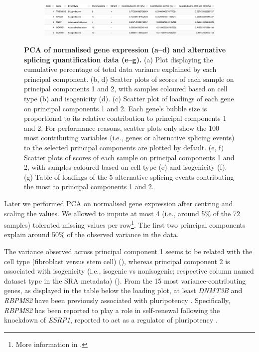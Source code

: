 \begin{figure}[!h]
\begin{subfigure}[h]{0.32\textwidth}
	\end{subfigure}
	\begin{subfigure}[h]{0.96\textwidth}
		\includegraphics[width=\textwidth]{images/psichomics/5-pca/g}
	\end{subfigure}
    \caption[Principal component analysis]{\textbf{PCA of normalised gene expression (a–d) and alternative splicing quantification data (e–g).} (a) Plot displaying the cumulative percentage of total data variance explained by each principal component. (b, d) Scatter plots of scores of each sample on principal components 1 and 2, with samples coloured based on cell type (b) and isogenicity (d). (c) Scatter plot of loadings of each gene on principal components 1 and 2. Each gene’s bubble size is proportional to its relative contribution to principal components 1 and 2. For performance reasons, scatter plots only show the 100 most contributing variables (i.e., genes or alternative splicing events) to the selected principal components are plotted by default. (e, f) Scatter plots of scores of each sample on principal components 1 and 2, with samples coloured based on cell type (e) and isogenicity (f). (g) Table of loadings of the 5 alternative splicing events contributing the most to principal components 1 and 2.}
    \label{fig:psichomics-pca}
\end{figure}


Later we performed PCA on normalised gene expression after centring and scaling the values. We allowed to impute at most 4 (i.e., around 5\% of the 72 samples) tolerated missing values per row\footnote{More information in .}. The first two principal components explain around 50\% of the observed variance in the data.

The variance observed across principal component 1 seems to be related with the cell type (fibroblast versus stem cell) (), whereas principal component 2 is associated with isogenicity (i.e., isogenic vs nonisogenic; respective column named dataset type in the SRA metadata) (). From the 15 most variance-contributing genes, as displayed in the table below the loading plot, at least \emph{DNMT3B} and \emph{RBPMS2} have been previously associated with pluripotency \cite{fagoonee:2013vx}. Specifically, \emph{RBPMS2} has been reported to play a role in self-renewal following the knockdown of \emph{ESRP1}, reported to act as a regulator of pluripotency \cite{fagoonee:2013vx}.

